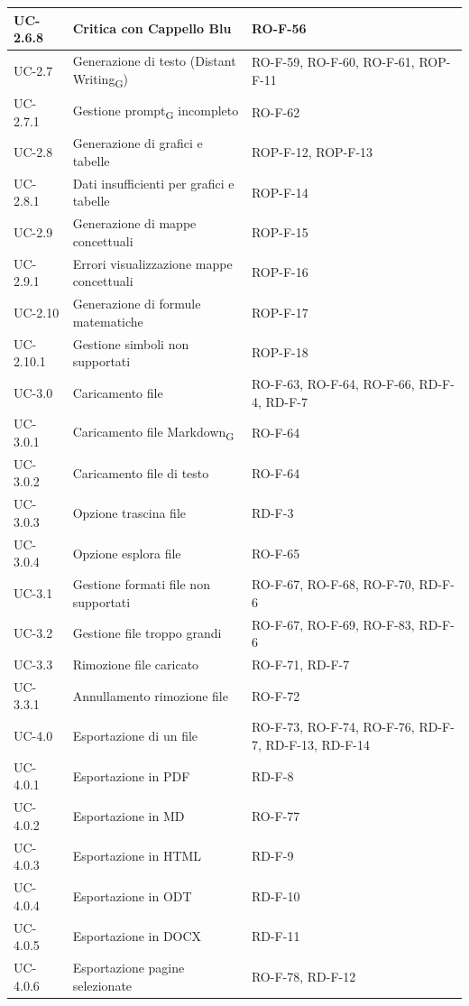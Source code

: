 \documentclass[11pt,a4paper]{article}
\newcommand{\gls}[1]{#1\textsubscript{G}}
\begin{document}
\begin{longtable}{|p{}|p{}|>{\raggedright\arraybackslash}p{}|}
\hline
UC-2.6.8 & Critica con Cappello Blu & RO-F-56 \\
\hline
UC-2.7 & Generazione di testo (\gls{Distant Writing}) & RO-F-59, RO-F-60, RO-F-61, ROP-F-11 \\
\hline
UC-2.7.1 & Gestione \gls{prompt} incompleto & RO-F-62 \\
\hline
UC-2.8 & Generazione di grafici e tabelle & ROP-F-12, ROP-F-13 \\
\hline
UC-2.8.1 & Dati insufficienti per grafici e tabelle & ROP-F-14 \\
\hline
UC-2.9 & Generazione di mappe concettuali & ROP-F-15 \\
\hline
UC-2.9.1 & Errori visualizzazione mappe concettuali & ROP-F-16 \\
\hline
UC-2.10 & Generazione di formule matematiche & ROP-F-17 \\
\hline
UC-2.10.1 & Gestione simboli non supportati & ROP-F-18 \\
\hline
UC-3.0 & Caricamento file & RO-F-63, RO-F-64, RO-F-66, RD-F-4, RD-F-7 \\
\hline
UC-3.0.1 & Caricamento file \gls{Markdown} & RO-F-64 \\
\hline
UC-3.0.2 & Caricamento file di testo & RO-F-64 \\
\hline
UC-3.0.3 & Opzione trascina file & RD-F-3 \\
\hline
UC-3.0.4 & Opzione esplora file & RO-F-65 \\
\hline
UC-3.1 & Gestione formati file non supportati & RO-F-67, RO-F-68, RO-F-70, RD-F-6 \\
\hline
UC-3.2 & Gestione file troppo grandi & RO-F-67, RO-F-69, RO-F-83, RD-F-6 \\
\hline
UC-3.3 & Rimozione file caricato & RO-F-71, RD-F-7 \\
\hline
UC-3.3.1 & Annullamento rimozione file & RO-F-72 \\
\hline
UC-4.0 & Esportazione di un file & RO-F-73, RO-F-74, RO-F-76, RD-F-7, RD-F-13, RD-F-14 \\
\hline
UC-4.0.1 & Esportazione in PDF & RD-F-8 \\
\hline
UC-4.0.2 & Esportazione in MD & RO-F-77 \\
\hline
UC-4.0.3 & Esportazione in HTML & RD-F-9 \\
\hline
UC-4.0.4 & Esportazione in ODT & RD-F-10 \\
\hline
UC-4.0.5 & Esportazione in DOCX & RD-F-11 \\
\hline
UC-4.0.6 & Esportazione pagine selezionate & RO-F-78, RD-F-12 \\

\end{longtable}
\end{document}
